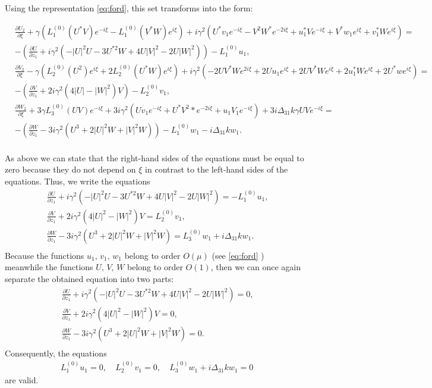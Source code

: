 \documentclass[a4paper, 12pt, onecolumn]{extarticle}
\begin{document}
Using the representation \eqref{eq:ford}, this set transforms into the form:
\begin{small}
\[\begin{aligned}
&\frac{\partial U_2}{\partial \xi}+\gamma(L_1^{(0)}(U^*V)e^{-i\xi}-L_1^{(0)}(V^*W)e^{i\xi})+i\gamma^2(U^*v_1e^{-i\xi}-V^2W^*e^{-2i\xi}+u_1^*Ve^{-i\xi}+V^*w_1e^{i\xi}+v_1^*We^{i\xi})=\\
&-\left(\frac{\partial U}{\partial z_1}+i\gamma^2(-|U|^2U-3U^{*2}W+4U|V|^2-2U|W|^2)\right)-L_1^{(0)}u_1,\\
&\frac{\partial V_2}{\partial \xi}-\gamma(L_2^{(0)}(U^2)e^{i\xi}+2L_2^{(0)}(U^*W)e^{i\xi})+i\gamma^2(-2UV^*We^{2i\xi}+2Uu_1e^{i\xi}+2UV^*We^{i\xi}+2u_1^*We^{i\xi}+2U^*we^{i\xi})=\\
&-\left(\frac{\partial V}{\partial z_1}+2i\gamma^2(4|U|-|W|^2)V\right)-L_2^{(0)}v_1,\\
&\frac{\partial W_2}{\partial \xi}+3\gamma L_3^{(0)}(UV)e^{-i\xi}+3i\gamma^2(Uv_1e^{-i\xi}+U^*V^2*e^{-2i\xi}+u_1V_1e^{-i\xi})+3i\Delta_{31}k\gamma UVe^{-i\xi}=\\
&-\left(\frac{\partial W}{\partial z_1}-3i\gamma^2(U^3+2|U|^2W+|V|^2W)\right)-L_1^{(0)}w_1-i\Delta_{31}kw_1.\\
\end{aligned}\]
\end{small}
As above we can state that the right-hand sides of the equations must be equal to zero because they do not depend on \(\xi\) in contrast to the left-hand sides of the equations. Thus, we write the equations
\[\begin{aligned}
&\frac{\partial U}{\partial z_1}+i\gamma^2(-|U|^2U-3U^{*2}W+4U|V|^2-2U|W|^2)=-L_1^{(0)}u_1,\\
&\frac{\partial V}{\partial z_1}+2i\gamma^2(4|U|^2-|W|^2)V=L_2^{(0)}v_1,\\
&\frac{\partial W}{\partial z_1}-3i\gamma^2(U^3+2|U|^2W+|V|^2W)=L_3^{(0)}w_1+i\Delta_{31}kw_1.\\
\end{aligned}\]
Because the functions \(u_1,\,v_1,\,w_1\)  belong to order \(O(\mu)\) (see \eqref{eq:ford} ) meanwhile the functions \(U,\,V,\,W\) belong to order \(O(1)\), then we can once again separate the obtained equation into two parts: 
\begin{equation}
\label{eq:mai}
\begin{aligned}
&\frac{\partial U}{\partial z_1}+i\gamma^2(-|U|^2U-3U^{*2}W+4U|V|^2-2U|W|^2)=0,\\
&\frac{\partial V}{\partial z_1}+2i\gamma^2(4|U|^2-|W|^2)V=0,\\
&\frac{\partial W}{\partial z_1}-3i\gamma^2(U^3+2|U|^2W+|V|^2W)=0.\\
\end{aligned}
\end{equation}
 Consequently, the equations
\begin{equation}
\begin{aligned}
&L_1^{(0)}u_1=0,\
&L_2^{(0)}v_1=0,\
&L_3^{(0)}w_1+i\Delta_{31}kw_1=0\
\end{aligned}
\end{equation}
are valid.
\end{document}
